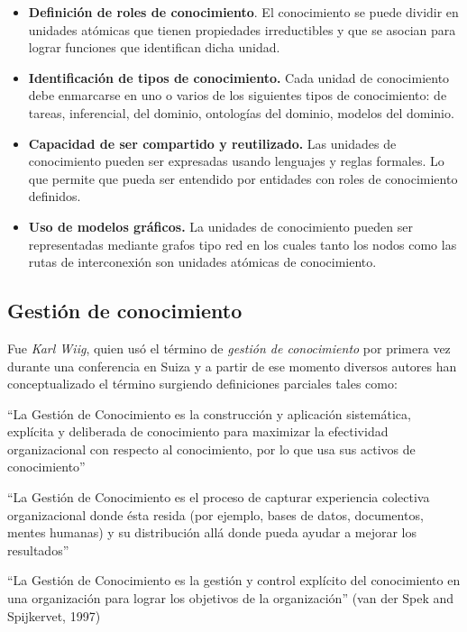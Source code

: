 \begin{itemize}
\item \textbf{Definición de roles de conocimiento}. El conocimiento se puede dividir en unidades atómicas que tienen propiedades irreductibles y que se asocian para lograr funciones que identifican dicha unidad.

\item \textbf{Identificación de tipos de conocimiento.} Cada unidad de conocimiento debe enmarcarse en uno o varios de los siguientes tipos de conocimiento: de tareas, inferencial, del dominio, ontologías del dominio, modelos del dominio. 

\item \textbf{Capacidad de ser compartido y reutilizado.} Las unidades de conocimiento pueden ser expresadas usando lenguajes y reglas formales. Lo que permite que pueda ser entendido por entidades con roles de conocimiento definidos.

\item \textbf{Uso de modelos gráficos.} La unidades de conocimiento pueden ser representadas mediante grafos tipo red en los cuales tanto los nodos como las rutas de interconexión son unidades atómicas de conocimiento.
\end{itemize}


\subsection{Gestión de conocimiento}

Fue \textit{Karl Wiig}, quien usó el término de \textit{gestión de conocimiento} por primera vez durante una conferencia en Suiza y a partir de ese momento diversos autores han conceptualizado el término surgiendo definiciones parciales tales como:

“La Gestión de Conocimiento es la construcción y aplicación sistemática, explícita y deliberada de conocimiento para maximizar la efectividad organizacional con respecto al conocimiento, por lo que usa sus activos de conocimiento”\cite{wiig1993}

“La Gestión de Conocimiento es el proceso de capturar experiencia colectiva organizacional donde ésta resida (por ejemplo, bases de datos, documentos, mentes humanas) y su distribución allá donde pueda ayudar a mejorar los resultados”\cite{hibbard1997}

“La Gestión de Conocimiento es la gestión y control explícito del conocimiento en una organización para lograr los objetivos de la organización” (van der Spek and Spijkervet, 1997)

